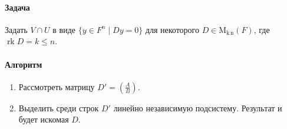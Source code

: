 \documentclass{article}
\newcommand{\MatrixDim}[3]{\operatorname{\mathrm{M}_{#2\,#3}}(#1)}
\newcommand{\rk}{\operatorname{rk}}
\begin{document}
\paragraph{Задача}

Задать $V\cap U$ в виде $\{y\in F^{n}\mid D y = 0\}$ для некоторого $D\in\MatrixDim{F}{k}{n}$, где $\rk D = k\leqslant n$.

\paragraph{Алгоритм}

\begin{enumerate}
\item Рассмотреть матрицу $D' = \left(\frac{A}{B}\right)$.

\item Выделить среди строк $D'$ линейно независимую подсистему.
Результат и будет искомая $D$.
\end{enumerate}
\end{document}
